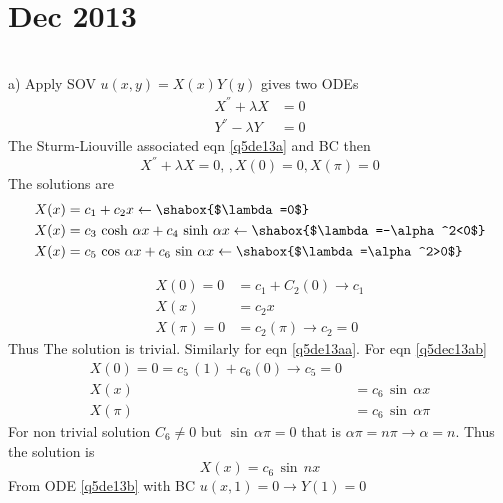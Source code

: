 \section{Dec 2013}
\\
a) Apply SOV $u(x,y)=X(x)Y(y)$ gives two ODEs
\begin{align}
X^{''}+\lambda X&=0\label{q5de13a}\\
Y^{''}-\lambda Y&=0\label{q5de13b}
\end{align}
The Sturm-Liouville associated eqn \eqref{q5de13a} and BC then 
\begin{equation}
X^{''}+\lambda X=0,\,,X(0)=0,X(\pi)=0
\end{equation}
The solutions are
\begin{align}
X(x)&=c_1+c_2 x\leftarrow\shabox{$\lambda=0$}\label{q5de13c}\\
X(x)&=c_3\,\cosh\,\alpha x+c_4\,\sinh\,\alpha x\leftarrow\shabox{$\lambda=-\alpha^2<0$}\label{q5de13aa}\\
X(x)&=c_5\,\cos\,\alpha x+c_6\,\sin\,\alpha x\leftarrow\shabox{$\lambda=\alpha^2>0$}\label{q5dec13ab}
\end{align}

\begin{align*}
X(0)=0&=c_1+C_2(0)\to c_1\\
X(x)&=c_2x\\
X(\pi)=0&=c_2(\pi)\to c_2=0
\end{align*}
Thus The solution is trivial. Similarly for eqn \eqref{q5de13aa}.
For eqn \eqref{q5dec13ab}
\begin{align}
X(0)=0=c_5\,(1)+c_6(0)\to c_5=0\\
X(x)&=c_6\,\sin\,\alpha x\\
X(\pi)&=c_6\,\sin\,\alpha \pi
\end{align}
For non trivial solution $C_6\neq 0$ but $\sin\,\alpha \pi=0$ that is $\alpha\pi=n\pi\to \alpha=n$. Thus the solution is
\begin{equation}
X(x)=c_6\,\sin\,n x
\end{equation}
From ODE \eqref{q5de13b} with BC $u(x,1)=0\to Y(1)=0$
                                       
